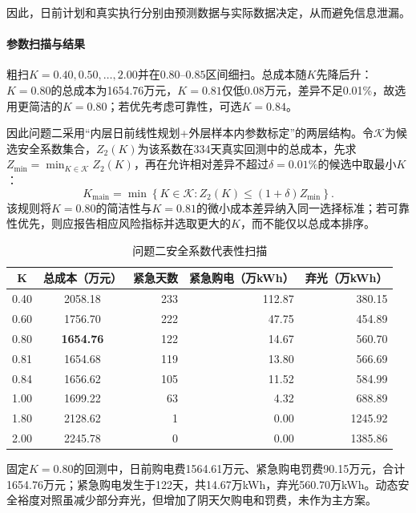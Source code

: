 \documentclass{cumcmthesis}
\begin{document}
因此，日前计划和真实执行分别由预测数据与实际数据决定，从而避免信息泄漏。

\paragraph{参数扫描与结果}

粗扫$K=0.40,0.50,\ldots,2.00$并在$0.80$--$0.85$区间细扫。总成本随$K$先降后升：$K=0.80$的总成本为1654.76万元，$K=0.81$仅低0.08万元，差异不足0.01\%，故选用更简洁的$K=0.80$；若优先考虑可靠性，可选$K=0.84$。

因此问题二采用“内层日前线性规划+外层样本内参数标定”的两层结构。令$\mathcal K$为候选安全系数集合，$Z_2(K)$为该系数在334天真实回测中的总成本，先求$Z_{\min}=\min_{K\in\mathcal K}Z_2(K)$，再在允许相对差异不超过$\delta=0.01\%$的候选中取最小$K$：
\begin{equation}
K_{\mathrm{main}}=\min\left\{K\in\mathcal K:Z_2(K)\leq(1+\delta)Z_{\min}\right\}.
\tag{15a}
\end{equation}
该规则将$K=0.80$的简洁性与$K=0.81$的微小成本差异纳入同一选择标准；若可靠性优先，则应报告相应风险指标并选取更大的$K$，而不能仅以总成本排序。


\begin{table}[H]
\centering
\normalsize
\setlength{\tabcolsep}{8pt}
\renewcommand\arraystretch{1.3}
\caption{问题二安全系数代表性扫描}
\label{tab:q2scan}
\begin{tabular}{ccrrr}
\toprule
$\boldsymbol{K}$ &
\textbf{总成本（万元）} &
\textbf{紧急天数} &
\textbf{紧急购电（万kWh）} &
\textbf{弃光（万kWh）}\\
\midrule
0.40 & 2058.18 & 233 & 112.87 & 380.15\\
0.60 & 1756.70 & 222 & 47.75 & 454.89\\
0.80 & \textbf{1654.76} & 122 & 14.67 & 560.70\\
0.81 & 1654.68 & 119 & 13.80 & 566.69\\
0.84 & 1656.62 & 105 & 11.52 & 584.99\\
1.00 & 1699.22 & 63 & 4.32 & 688.89\\
1.80 & 2128.62 & 1 & 0.00 & 1245.92\\
2.00 & 2245.78 & 0 & 0.00 & 1385.86\\
\bottomrule
\end{tabular}
\end{table}

固定$K=0.80$的回测中，日前购电费1564.61万元、紧急购电罚费90.15万元，合计1654.76万元；紧急购电发生于122天，共14.67万kWh，弃光560.70万kWh。动态安全裕度对照虽减少部分弃光，但增加了阴天欠购电和罚费，未作为主方案。
\end{document}
